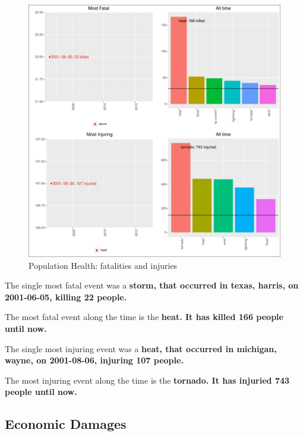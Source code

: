 \documentclass[]{article}
\begin{document}
\begin{figure}[htbp]
\centering
\includegraphics{readme_files/figure-latex/health-plot-1.pdf}
\caption{Population Health: fatalities and injuries}
\end{figure}

The single most fatal event was a \textbf{storm, that occurred in texas,
harris, on 2001-06-05, killing 22 people.}

The most fatal event along the time is the \textbf{heat. It has killed
166 people until now.}

The single most injuring event was a \textbf{heat, that occurred in
michigan, wayne, on 2001-08-06, injuring 107 people.}

The most injuring event along the time is the \textbf{tornado. It has
injuried 743 people until now.}

\subsection{Economic Damages}\label{economic-damages}
\end{document}
